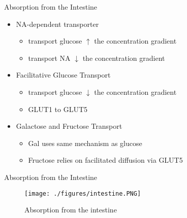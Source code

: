 \documentclass[presentation, smaller]{beamer}
\begin{document}
\begin{frame}[label={sec:org1642635}]{Absorption from the Intestine}
\begin{itemize}
\item NA-dependent transporter
\begin{itemize}
\item transport glucose \(\uparrow\) the concentration gradient
\item transport NA \(\downarrow\) the concentration gradient
\end{itemize}
\item Facilitative Glucose Transport
\begin{itemize}
\item transport glucose \(\downarrow\) the concentration gradient
\item GLUT1 to GLUT5
\end{itemize}
\item Galactose and Fructose Transport
\begin{itemize}
\item Gal uses same mechanism as glucose
\item Fructose relies on facilitated diffusion via GLUT5
\end{itemize}
\end{itemize}
\end{frame}

\begin{frame}[label={sec:orgfa49fb9}]{Absorption from the Intestine}
\begin{figure}[htbp]
\centering
\texttt{[image: ./figures/intestine.PNG]}
\caption{\label{fig:orgbac8fea}
Absorption from the intestine}
\end{figure}
\end{frame}
\end{document}
